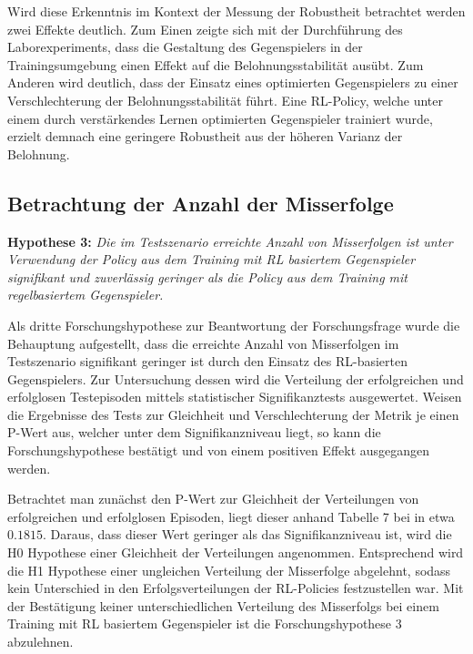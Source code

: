 Wird diese Erkenntnis im Kontext der Messung der Robustheit betrachtet werden zwei Effekte deutlich.
Zum Einen zeigte sich mit der Durchführung des Laborexperiments, dass die Gestaltung des Gegenspielers in der Trainingsumgebung einen Effekt auf die Belohnungsstabilität ausübt.
Zum Anderen wird deutlich, dass der Einsatz eines optimierten Gegenspielers zu einer Verschlechterung der Belohnungsstabilität führt.
Eine RL-Policy, welche unter einem durch verstärkendes Lernen optimierten Gegenspieler trainiert wurde, erzielt demnach eine geringere Robustheit aus der höheren Varianz der Belohnung.

\subsection{Betrachtung der Anzahl der Misserfolge}

\textbf{Hypothese 3:}
\textit{Die im Testszenario erreichte Anzahl von Misserfolgen ist unter Verwendung der Policy aus dem Training mit RL basiertem Gegenspieler signifikant und zuverlässig geringer als die Policy aus dem Training mit regelbasiertem Gegenspieler.}

Als dritte Forschungshypothese zur Beantwortung der Forschungsfrage wurde die Behauptung aufgestellt, dass die erreichte Anzahl von Misserfolgen im Testszenario signifikant geringer ist durch den Einsatz des RL-basierten Gegenspielers.
Zur Untersuchung dessen wird die Verteilung der erfolgreichen und erfolglosen Testepisoden mittels statistischer Signifikanztests ausgewertet. 
Weisen die Ergebnisse des Tests zur Gleichheit und Verschlechterung der Metrik je einen P-Wert aus, welcher unter dem Signifikanzniveau liegt, so kann die Forschungshypothese bestätigt und von einem positiven Effekt ausgegangen werden.

Betrachtet man zunächst den P-Wert zur Gleichheit der Verteilungen von erfolgreichen und erfolglosen Episoden, liegt dieser anhand Tabelle 7 bei in etwa $0.1815$.
Daraus, dass dieser Wert geringer als das Signifikanzniveau ist, wird die H0 Hypothese einer Gleichheit der Verteilungen angenommen.
Entsprechend wird die H1 Hypothese einer ungleichen Verteilung der Misserfolge abgelehnt, sodass kein Unterschied in den Erfolgsverteilungen der RL-Policies festzustellen war.
Mit der Bestätigung keiner unterschiedlichen Verteilung des Misserfolgs bei einem Training mit RL basiertem Gegenspieler ist die Forschungshypothese 3 abzulehnen.


